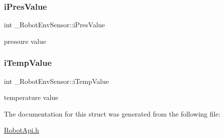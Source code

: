 \subsubsection{\texorpdfstring{i\+Pres\+Value}{iPresValue}}
{\footnotesize\ttfamily int \+\_\+\+Robot\+Env\+Sensor\+::i\+Pres\+Value}

pressure value \mbox{\label{struct__RobotEnvSensor_ab0ae3d1ccf7267172b5e03e36fb9b469}} 
\subsubsection{\texorpdfstring{i\+Temp\+Value}{iTempValue}}
{\footnotesize\ttfamily int \+\_\+\+Robot\+Env\+Sensor\+::i\+Temp\+Value}

temperature value 

The documentation for this struct was generated from the following file\+:\begin{DoxyCompactItemize}
\item 
\hyperlink{RobotApi_8h}{Robot\+Api.\+h}\end{DoxyCompactItemize}

